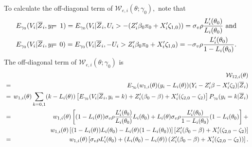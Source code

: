 \documentclass[12pt,titlepage,final,oneside,letterpaper]{article}
\begin{document}
To calculate the off-diagonal term of $\mathcal{W}_{e,i}(\theta ;\gamma
_{0}),$ note that%
\begin{eqnarray}
E_{\gamma _{0}}(V_{i}|\overline{Z}_{i},y_{i}\hspace{-0.08in} &=&\hspace{%
-0.08in}1)=E_{\gamma _{0}}(V_{i}|\overline{Z}_{i},U_{i}>-(Z_{i}^{\prime
}\beta _{0}\pi _{0}+X_{i}^{\prime }\zeta _{1,0}))=\sigma _{v}\rho \frac{%
L_{i}^{\prime }(\theta _{0})}{L_{i}(\theta _{0})}\text{ and}  \notag \\
E_{\gamma _{0}}(V_{i}|\overline{Z}_{i},y_{i}\hspace{-0.08in} &=&\hspace{%
-0.08in}0)=E_{\gamma _{0}}(V_{i}|\overline{Z}_{i},-U_{i}>Z_{i}^{\prime
}\beta _{0}\pi _{0}+X_{i}^{\prime }\zeta _{1,0})=-\sigma _{v}\rho \frac{%
L_{i}^{\prime }(\theta _{0})}{1-L_{i}(\theta _{0})}\text{.}
\end{eqnarray}%
The off-diagonal term of $\mathcal{W}_{e,i}(\theta ;\gamma _{0})$ is%
\begin{eqnarray}
&&\mathcal{W}_{12,i}(\theta )  \notag \\
\hspace{-0.08in} &=&\hspace{-0.08in}E_{\gamma _{0}}(w_{1,i}(\theta
)(y_{i}-L_{i}(\theta ))(Y_{i}-Z_{i}^{\prime }\beta -X_{i}^{\prime }\zeta
_{2})|\overline{Z}_{i})  \notag \\
\hspace{-0.08in} &=&\hspace{-0.08in}w_{1,i}(\theta
)\sum_{k=0,1}(k-L_{i}(\theta ))\left[ E_{\gamma _{0}}(V_{i}|\overline{Z}%
_{i},y_{i}=k)+Z_{i}^{\prime }(\beta _{0}-\beta )+X_{i}^{\prime }(\zeta
_{2,0}-\zeta _{2})\right] P_{\gamma _{0}}(y_{i}=k|\overline{Z}_{i})  \notag
\\
\hspace{-0.08in} &=&\hspace{-0.08in}w_{1,i}(\theta )\left[ (1-L_{i}(\theta
))\sigma _{v}\rho \frac{L_{i}^{\prime }(\theta _{0})}{L_{i}(\theta _{0})}%
L_{i}(\theta _{0})+L_{i}(\theta )\sigma _{v}\rho \frac{L_{i}^{\prime
}(\theta _{0})}{1-L_{i}(\theta _{0})}(1-L_{i}(\theta _{0})\right] +  \notag
\\
&&w_{1,i}(\theta )\left[ (1-L_{i}(\theta ))L_{i}(\theta _{0})-L_{i}(\theta
)(1-L_{i}(\theta _{0}))\right] \left[ Z_{i}^{\prime }(\beta _{0}-\beta
)+X_{i}^{\prime }(\zeta _{2,0}-\zeta _{2})\right]   \notag \\
\hspace{-0.08in} &=&\hspace{-0.08in}w_{1,i}(\theta )\left[ \sigma _{v}\rho
L_{i}^{\prime }(\theta _{0})+\left( L_{i}(\theta _{0})-L_{i}(\theta )\right)
\left( Z_{i}^{\prime }(\beta _{0}-\beta )+X_{i}^{\prime }(\zeta _{2,0}-\zeta
_{2})\right) \right] .  \label{Probit_W12}
\end{eqnarray}
\end{document}
